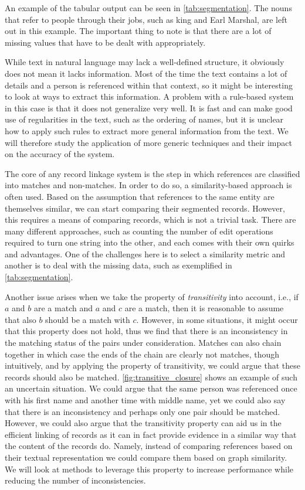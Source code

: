 An example of the tabular output can be seen in \cref{tab:segmentation}.
The nouns that refer to people through their jobs, such as king and Earl Marshal, are left out in this example.
The important thing to note is that there are a lot of missing values that have to be dealt with appropriately.

While text in natural language may lack a well-defined structure, it obviously does not mean it lacks information.
Most of the time the text contains a lot of details and a person is referenced within that context, so it might be interesting to look at ways to extract this information.
A problem with a rule-based system in this case is that it does not generalize very well.
It is fast and can make good use of regularities in the text, such as the ordering of names, but it is unclear how to apply such rules to extract more general information from the text.
We will therefore study the application of more generic techniques and their impact on the accuracy of the system.

The core of any record linkage system is the step in which references are classified into matches and non-matches.
In order to do so, a similarity-based approach is often used.
Based on the assumption that references to the same entity are themselves similar, we can start comparing their segmented records.
However, this requires a means of comparing records, which is not a trivial task.
There are many different approaches, such as counting the number of edit operations required to turn one string into the other, and each comes with their own quirks and advantages.
One of the challenges here is to select a similarity metric and another is to deal with the missing data, such as exemplified in \cref{tab:segmentation}.

Another issue arises when we take the property of \emph{transitivity} into account, i.e., if $a$ and $b$ are a match and $a$ and $c$ are a match, then it is reasonable to assume that also $b$ should be a match with $c$.
However, in some situations, it might occur that this property does not hold, thus we find that there is an inconsistency in the matching status of the pairs under consideration.
Matches can also chain together in which case the ends of the chain are clearly not matches, though intuitively, and by applying the property of transitivity, we could argue that these records should also be matched.
\cref{fig:transitive_closure} shows an example of such an uncertain situation.
We could argue that the same person was referenced once with his first name and another time with middle name, yet we could also say that there is an inconsistency and perhaps only one pair should be matched.
However, we could also argue that the transitivity property can aid us in the efficient linking of records as it can in fact provide evidence in a similar way that the content of the records do.
Namely, instead of comparing references based on their textual representation we could compare them based on graph similarity.
We will look at methods to leverage this property to increase performance while reducing the number of inconsistencies.

